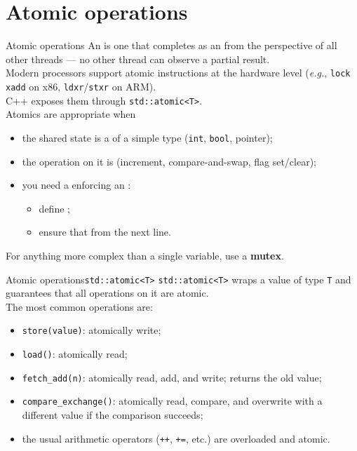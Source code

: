 
\section{Atomic operations}
\graphicspath{{figs/section6/}}

\begin{frame}{Atomic operations}
	\justifying
	An  is one that completes as an  from the perspective of all other threads — no other thread can observe a partial result.\\
	\medskip
	Modern processors support atomic  instructions at the hardware level (\emph{e.g.}, \texttt{lock xadd} on x86, \texttt{ldxr}/\texttt{stxr} on ARM).\\
	C++ exposes them through \texttt{std::atomic<T>}.\\
	\medskip
	Atomics are appropriate when
	\begin{itemize}
		\item the shared state is a  of a simple type (\texttt{int}, \texttt{bool}, pointer);
		\item the operation on it is  (increment, compare-and-swap, flag set/clear);
		\item you need a  enforcing an :
      \begin{itemize}
        \item define ;
        \item ensure that  from the next line.
      \end{itemize}
	\end{itemize}
	\begin{block}{}
		\centering
		For anything more complex than a single variable, use a \textbf{mutex}.
	\end{block}
\end{frame}
\begin{frame}{Atomic operations}{\texttt{std::atomic<T>}}
	\justifying
	\texttt{std::atomic<T>} wraps a value of type \texttt{T} and guarantees that all operations on it are atomic.\\
	The most common operations are:
	\begin{itemize}
		\item \texttt{store(value)}: atomically write;
		\item \texttt{load()}: atomically read;
		\item \texttt{fetch\_add(n)}: atomically read, add, and write; returns the old value;
		\item \texttt{compare\_exchange()}: atomically read, compare, and overwrite with a different value if the comparison succeeds;
		\item the usual arithmetic operators (\texttt{++}, \texttt{+=}, etc.) are overloaded and atomic.
	\end{itemize}
\end{frame}

